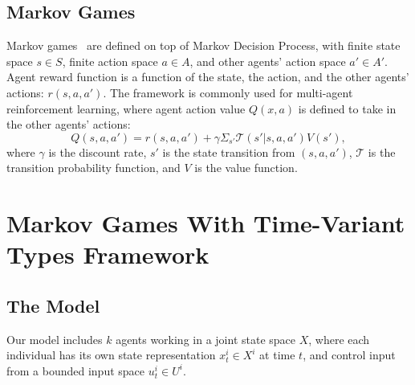 \documentclass[letterpaper, 10 pt, conference]{ieeeconf}  %
\begin{document}

\vspace{-.2em}
\subsection{Markov Games}
\vspace{-.2em}
Markov games~\cite{littman1994markov} are defined on top of Markov Decision Process, with finite state space $s \in S$, finite action space $a \in A$, and other agents' action space 
$a' \in A'$.  Agent reward function is a function of the state, the action, and the other agents' actions: $r(s,a,a')$. The framework is commonly used for multi-agent reinforcement 
learning, where agent action value $Q(x,a)$ is defined to take in the other agents' actions:
\begin{equation}
  Q(s,a,a') = r(s,a,a') + \gamma \Sigma_{s'}\mathcal{T}(s'|s,a,a')V(s'),
\end{equation}
where $\gamma$ is the discount rate, $s'$ is the state transition from 
$(s,a,a')$, $\mathcal{T}$ is the transition probability function, and $V$ is the value 
function.

\section{Markov Games With Time-Variant Types Framework}
\subsection{The Model}
Our model includes $k$ agents working in a joint state space $X$, where each individual has its own state representation $x_t^i \in X^i$ at time $t$, and control input from a bounded 
input space $u_t^i \in U^i$. 
\end{document}
